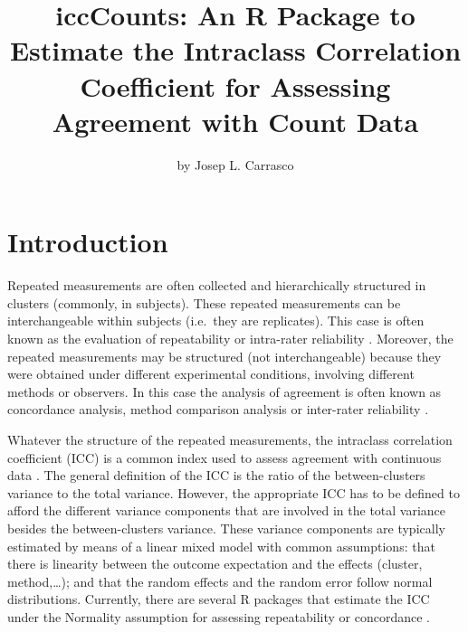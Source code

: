 \title{iccCounts: An R Package to Estimate the Intraclass Correlation
Coefficient for Assessing Agreement with Count Data}
\author{by Josep L. Carrasco}

\maketitle


\hypertarget{introduction}{%
\section{Introduction}\label{introduction}}

Repeated measurements are often collected and hierarchically structured
in clusters (commonly, in subjects). These repeated measurements can be
interchangeable within subjects (i.e.~they are replicates). This case is
often known as the evaluation of repeatability \citep{nakagawa2010} or
intra-rater reliability \citep{DeVet2011}. Moreover, the repeated
measurements may be structured (not interchangeable) because they were
obtained under different experimental conditions, involving different
methods or observers. In this case the analysis of agreement is often
known as concordance analysis, method comparison analysis
\citep{Choudhary2017} or inter-rater reliability \citep{DeVet2011}.

Whatever the structure of the repeated measurements, the intraclass
correlation coefficient (ICC) is a common index used to assess agreement
with continuous data \citep{fleiss1986, carrasco2003}. The general
definition of the ICC is the ratio of the between-clusters variance to
the total variance. However, the appropriate ICC has to be defined to
afford the different variance components that are involved in the total
variance besides the between-clusters variance. These variance
components are typically estimated by means of a linear mixed model with
common assumptions: that there is linearity between the outcome
expectation and the effects (cluster, method,\ldots); and that the
random effects and the random error follow normal distributions.
Currently, there are several R packages that estimate the ICC under the
Normality assumption for assessing repeatability or concordance
\citep{Wolak2012, carrasco2013, Stoffel2017}.

